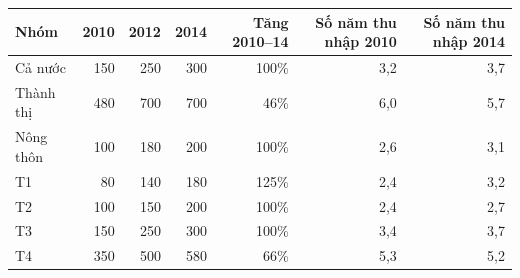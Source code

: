 \begin{tabular}{lrrrrrr}
\toprule
Nhóm & 2010 & 2012 & 2014 & Tăng 2010–14 & Số năm thu nhập 2010 & Số năm thu nhập 2014 \\
\midrule
Cả nước & 150 & 250 & 300 & 100\% & 3,2 & 3,7 \\
Thành thị & 480 & 700 & 700 & 46\% & 6,0 & 5,7 \\
Nông thôn & 100 & 180 & 200 & 100\% & 2,6 & 3,1 \\
T1 & 80 & 140 & 180 & 125\% & 2,4 & 3,2 \\
T2 & 100 & 150 & 200 & 100\% & 2,4 & 2,7 \\
T3 & 150 & 250 & 300 & 100\% & 3,4 & 3,7 \\
T4 & 350 & 500 & 580 & 66\% & 5,3 & 5,2 \\
\bottomrule
\end{tabular}

